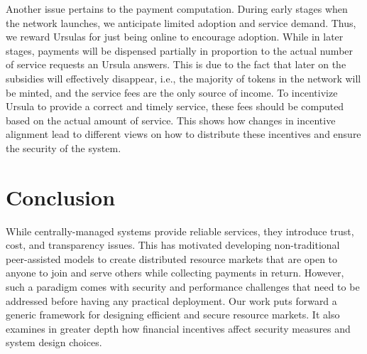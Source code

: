 \documentclass{llncs}
\begin{document}
Another issue pertains to the payment computation. During early stages when the network launches, we anticipate  limited adoption and service demand. Thus, we reward Ursulas for just being online to encourage adoption. While in later stages, payments will be dispensed partially in proportion to the actual number of service requests an Ursula answers. This is due to the fact that later on the subsidies will effectively disappear, i.e., the majority of tokens in the network will be minted, and the service fees are the only source of income. To incentivize Ursula to provide a correct and timely service, these fees should be computed based on the actual amount of service. This shows how changes in incentive alignment lead to different views on how to distribute these incentives and ensure the security of the system.


\section{Conclusion}
While centrally-managed systems provide reliable services, they introduce trust, cost, and transparency issues. This has motivated developing non-traditional peer-assisted models to create distributed resource markets that are open to anyone to join and serve others while collecting payments in return. However, such a paradigm comes with security and performance challenges that need to be addressed before having any practical deployment. Our work puts forward a generic framework for designing efficient and secure resource markets. It also examines in greater depth how financial incentives affect security measures and system design choices.


{\footnotesize \vspace{-6pt}

}

\normalsize

\end{document}
